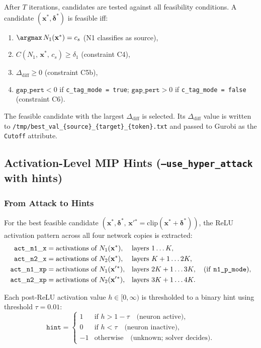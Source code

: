 \documentclass[11pt,a4paper]{article}
\theoremstyle{definition}
\theoremstyle{plain}
\newcommand{\Conf}[3]{C(#1,\,#2,\,#3)}
\newcommand{\NN}[1]{N_{#1}}
\newcommand{\vx}{\mathbf{x}}
\newcommand{\ve}{\boldsymbol{\delta}}
\newcommand{\vxp}{\mathbf{x}'}
\newcommand{\deltaone}{\delta_1}
\begin{document}
After $T$ iterations, candidates are tested against all feasibility conditions. A candidate $(\vx^*,\ve^*)$ is feasible iff:
\begin{enumerate}
  \item $\argmax\,\NN{1}(\vx^*) = c_s$ (N1 classifies as source),
  \item $\Conf{\NN{1}}{\vx^*}{c_s} \ge \deltaone$ (constraint C4),
  \item $\Delta_{\mathrm{diff}} \ge 0$ (constraint C5b),
  \item $\mathtt{gap\_pert} < 0$ if \texttt{c\_tag\_mode = true}; \quad $\mathtt{gap\_pert} > 0$ if \texttt{c\_tag\_mode = false} (constraint C6).
\end{enumerate}
The feasible candidate with the largest $\Delta_{\mathrm{diff}}$ is selected. Its $\Delta_{\mathrm{diff}}$ value is written to \texttt{/tmp/best\_val\_\{source\}\_\{target\}\_\{token\}.txt} and passed to Gurobi as the \texttt{Cutoff} attribute.

\subsection{Activation-Level MIP Hints (\texttt{--use\_hyper\_attack} with hints)}
\label{sec:hints}

\subsubsection{From Attack to Hints}

For the best feasible candidate $(\vx^*,\ve^*,\,\vxp{}^* = \mathrm{clip}(\vx^*+\ve^*))$, the ReLU activation pattern across all four network copies is extracted:
\begin{align*}
  \mathtt{act\_n1\_x}  &= \text{activations of } \NN{1}(\vx^*),    &&\text{layers } 1\ldots K, \\
  \mathtt{act\_n2\_x}  &= \text{activations of } \NN{2}(\vx^*),    &&\text{layers } K+1\ldots 2K, \\
  \mathtt{act\_n1\_xp} &= \text{activations of } \NN{1}(\vxp{}^*), &&\text{layers } 2K+1\ldots 3K, \quad\text{(if \texttt{n1\_p\_mode})},\\
  \mathtt{act\_n2\_xp} &= \text{activations of } \NN{2}(\vxp{}^*), &&\text{layers } 3K+1\ldots 4K.
\end{align*}

Each post-ReLU activation value $h \in [0,\infty)$ is thresholded to a binary hint using threshold $\tau = 0.01$:
\[
  \mathtt{hint} = \begin{cases}
    1  & \text{if } h > 1 - \tau \quad \text{(neuron active)}, \\
    0  & \text{if } h < \tau      \quad \text{(neuron inactive)}, \\
    -1 & \text{otherwise}          \quad \text{(unknown; solver decides)}.
  \end{cases}
\]
\end{document}
